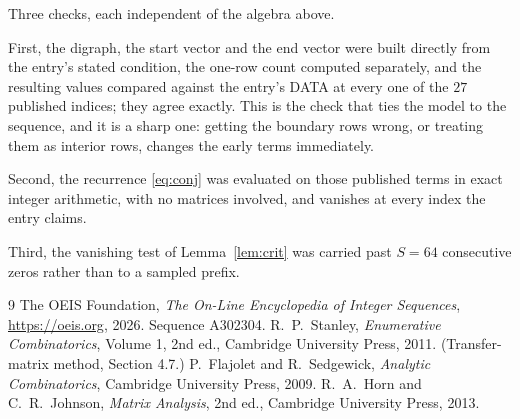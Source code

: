 \documentclass[11pt,a4paper]{article}
\theoremstyle{plain}
\theoremstyle{definition}
\begin{document}
Three checks, each independent of the algebra above.

First, the digraph, the start vector and the end vector were built directly from the
entry's stated condition, the one-row count computed separately, and the resulting values
compared against the entry's DATA at every one of the $27$ published indices; they
agree exactly. This is the check that ties the model to the sequence, and it is a sharp one:
getting the boundary rows wrong, or treating them as interior rows, changes the early terms
immediately.

Second, the recurrence \eqref{eq:conj} was evaluated on those published terms in exact
integer arithmetic, with no matrices involved, and vanishes at every index the entry claims.

Third, the vanishing test of Lemma~\ref{lem:crit} was carried past $S=64$ consecutive
zeros rather than to a sampled prefix.

\begin{thebibliography}{9}
 The OEIS Foundation, \emph{The On-Line Encyclopedia of Integer
Sequences}, \url{https://oeis.org}, 2026. Sequence A302304.
 R.~P.~Stanley, \emph{Enumerative Combinatorics}, Volume 1, 2nd ed.,
Cambridge University Press, 2011. (Transfer-matrix method, Section 4.7.)
 P.~Flajolet and R.~Sedgewick, \emph{Analytic Combinatorics}, Cambridge
University Press, 2009.
 R.~A.~Horn and C.~R.~Johnson, \emph{Matrix Analysis}, 2nd ed., Cambridge
University Press, 2013.
\end{thebibliography}
\end{document}
